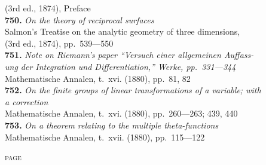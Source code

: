 \documentclass[12pt,a4paper,oneside]{book}
\begin{document}
\hspace*{2em}(3rd ed., 1874), Preface\\[0.2em]
\textbf{750.} \textit{On the theory of reciprocal surfaces} \\
\hspace*{2em}Salmon's Treatise on the analytic geometry of three dimensions,\\
\hspace*{2em}(3rd ed., 1874), pp.~539---550\\[0.2em]
\textbf{751.} \textit{Note on Riemann's paper ``Versuch einer allgemeinen Auffass-}\\
\hspace*{2em}\textit{ung der Integration und Differentiation,'' Werke, pp.~331---344}\\
\hspace*{2em}Mathematische Annalen, t.~xvi. (1880), pp.~81, 82\\[0.2em]
\textbf{752.} \textit{On the finite groups of linear transformations of a variable; with}\\
\hspace*{2em}\textit{a correction} \\
\hspace*{2em}Mathematische Annalen, t.~xvi. (1880), pp.~260---263; 439, 440\\[0.2em]
\textbf{753.} \textit{On a theorem relating to the multiple theta-functions} \\
\hspace*{2em}Mathematische Annalen, t.~xvii. (1880), pp.~115---122

\clearpage

\vspace*{1em}

\hfill\textsc{page}
\end{document}
